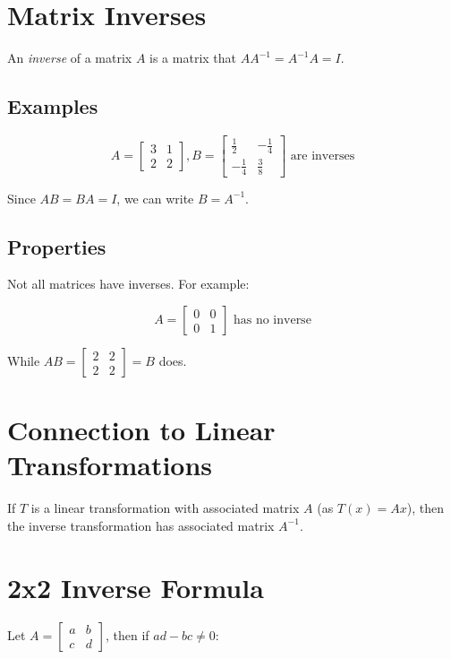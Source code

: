 \documentclass[12pt,a4paper]{article}
\begin{document}
\section{Matrix Inverses}

An \textit{inverse} of a matrix $A$ is a matrix that $AA^{-1} = A^{-1}A = I$.

\subsection{Examples}

\[ A = \begin{bmatrix} 3 & 1 \\ 2 & 2 \end{bmatrix}, B = \begin{bmatrix} \frac{1}{2} & -\frac{1}{4} \\ -\frac{1}{4} & \frac{3}{8} \end{bmatrix} \text{ are inverses} \]

Since $AB = BA = I$, we can write $B = A^{-1}$.

\subsection{Properties}

Not all matrices have inverses. For example:

\[ A = \begin{bmatrix} 0 & 0 \\ 0 & 1 \end{bmatrix} \text{ has no inverse} \]

While $AB = \begin{bmatrix} 2 & 2 \\ 2 & 2 \end{bmatrix} = B$ does.

\section{Connection to Linear Transformations}

If $T$ is a linear transformation with associated matrix $A$ (as $T(x) = Ax$), then the inverse transformation has associated matrix $A^{-1}$.

\section{2x2 Inverse Formula}

Let $A = \begin{bmatrix} a & b \\ c & d \end{bmatrix}$, then if $ad-bc \neq 0$:
\end{document}
